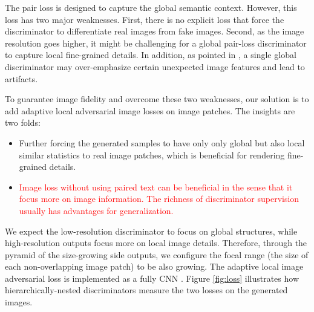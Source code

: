\documentclass[10pt,twocolumn,letterpaper]{article}
\begin{document}
The pair loss is designed to capture the global semantic context. However, this loss has two major weaknesses. First, there is no explicit loss that force the discriminator to differentiate real images from fake images. 
Second, as the image resolution goes higher, it might be challenging for a global pair-loss discriminator to capture local fine-grained details.  In addition, as pointed in \cite{shrivastava2016learning}, a single global discriminator may over-emphasize certain unexpected image features and lead to artifacts. 

To guarantee image fidelity and overcome these two weaknesses, our solution is to add adaptive local adversarial image losses on image patches. The insights are two folds:
\begin{itemize}\vspace{-.1cm}
\setlength\itemsep{-0.3em}
\item Further forcing the generated samples to have only only global but also local similar statistics to real image patches, which is beneficial for rendering fine-grained details. 

\item \textcolor{red}{Image loss without using paired text can be beneficial in the sense that it focus more on image information. The richness of discriminator supervision usually has advantages for generalization. } 
\vspace{-.2cm}

\end{itemize}
We expect the low-resolution discriminator to focus on global structures, while high-resolution outputs focus more on local image details. Therefore, through the pyramid of the size-growing side outputs, we configure the focal range (the size of each non-overlapping image patch) to be also growing.
The adaptive local image adversarial loss is implemented as a fully CNN \cite{shrivastava2016learning,zhu2017unpaired}.  
Figure \ref{fig:loss} illustrates how hierarchically-nested discriminators measure the two losses on the generated images. 
\end{document}
